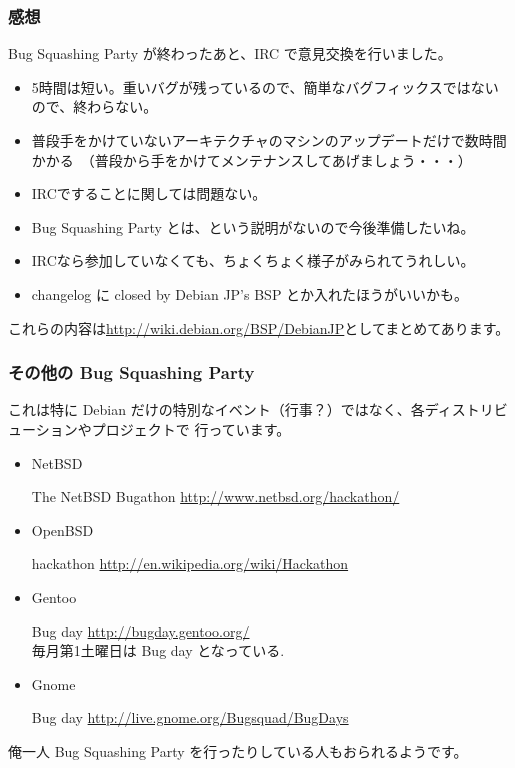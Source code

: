 \documentclass[mingoth,a4paper]{jsarticle}
\begin{document}
\subsubsection{感想}

 Bug Squashing Party が終わったあと、IRC で意見交換を行いました。

\begin{itemize}

    \item 5時間は短い。重いバグが残っているので、簡単なバグフィックスではないので、終わらない。
    \item 普段手をかけていないアーキテクチャのマシンのアップデートだけで数時間かかる　（普段から手をかけてメンテナンスしてあげましょう・・・）
    \item IRCですることに関しては問題ない。
    \item Bug Squashing Party とは、という説明がないので今後準備したいね。
    \item IRCなら参加していなくても、ちょくちょく様子がみられてうれしい。
    \item changelog に closed by Debian JP's BSP とか入れたほうがいいかも。

\end{itemize}

 これらの内容は\url{http://wiki.debian.org/BSP/DebianJP}としてまとめてあります。


\subsubsection{その他の Bug Squashing Party}
これは特に Debian だけの特別なイベント（行事？）ではなく、各ディストリビューションやプロジェクトで
行っています。
\begin{itemize}
	\item NetBSD
		
		The NetBSD Bugathon \url{http://www.netbsd.org/hackathon/} 
	\item OpenBSD

		hackathon \url{http://en.wikipedia.org/wiki/Hackathon}
	\item Gentoo

		Bug day \url{http://bugday.gentoo.org/} \\
		毎月第1土曜日は Bug day となっている.
	\item Gnome 

		Bug day \url{http://live.gnome.org/Bugsquad/BugDays}
\end{itemize}

俺一人 Bug Squashing Party を行ったりしている人もおられるようです。
\end{document}

